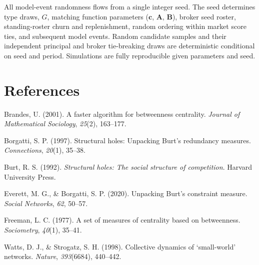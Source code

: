 \documentclass[11pt]{article}
\begin{document}
All model-event randomness flows from a single integer seed. The seed determines type draws, \(G\), matching function parameters (\(\mathbf{c}\), \(\mathbf{A}\), \(\mathbf{B}\)), broker seed roster, standing-roster churn and replenishment, random ordering within market score ties, and subsequent model events. Random candidate samples and their independent principal and broker tie-breaking draws are deterministic conditional on seed and period. Simulations are fully reproducible given parameters and seed.

\section{References}\label{references}

Brandes, U. (2001). A faster algorithm for betweenness centrality. \emph{Journal of Mathematical Sociology}, \emph{25}(2), 163--177.

Borgatti, S. P. (1997). Structural holes: Unpacking Burt's redundancy measures. \emph{Connections}, \emph{20}(1), 35--38.

Burt, R. S. (1992). \emph{Structural holes: The social structure of competition}. Harvard University Press.

Everett, M. G., \& Borgatti, S. P. (2020). Unpacking Burt's constraint measure. \emph{Social Networks}, \emph{62}, 50--57.

Freeman, L. C. (1977). A set of measures of centrality based on betweenness. \emph{Sociometry}, \emph{40}(1), 35--41.

Watts, D. J., \& Strogatz, S. H. (1998). Collective dynamics of `small-world' networks. \emph{Nature}, \emph{393}(6684), 440--442.
\end{document}
